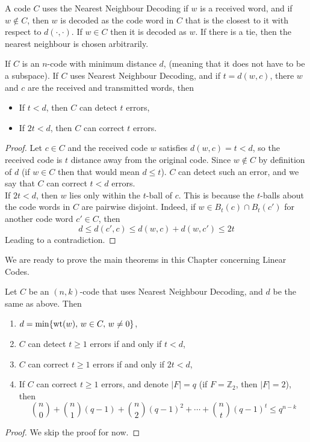 \documentclass[../../main.tex]{subfiles}
\begin{document}
\begin{definition} A code $C$ uses the Nearest Neighbour Decoding if $w$ is a received word, and if $w\notin C$, then $w$ is decoded as the code word in $C$ that is the closest to it with respect to $d(\cdot,\cdot)$. If $w\in C$ then it is decoded as $w$. If there is a tie, then the nearest neighbour is chosen arbitrarily.
\end{definition}
\begin{wts}
    If $C$ is an $n$-code with minimum distance $d$, (meaning that it does not have to be a subspace). If $C$ uses Nearest Neighbour Decoding, and if $t = d(w,c)$, there $w$ and $c$ are the received and transmitted words, then
    \begin{itemize}
        \item If $t<d$, then $C$ can detect $t$ errors,
        \item If $2t<d$, then $C$ can correct $t$ errors.
    \end{itemize}
\end{wts}
\begin{proof}
    Let $c\in C$ and the received code $w$ satisfies $d(w,c)=t<d$, so the received code is $t$ distance away from the original code. Since $w\notin C$ by definition of $d$ (if $w\in C$ then that would mean $d\leq t$). $C$ can detect such an error, and we say that $C$ can correct $t<d$ errors.\\
    
    If $2t<d$, then $w$ lies only within the $t$-ball of $c$. This is because the $t$-balls about the code words in $C$ are pairwise disjoint. Indeed, if $w\in B_t(c)\cap B_t(c')$ for another code word $c'\in C$, then
    \[
    d\leq d(c',c)\leq d(w,c) + d(w,c')\leq 2t
    \]
    Leading to a contradiction.
\end{proof}
We are ready to prove the main theorems in this Chapter concerning Linear Codes.
\begin{wts}
    Let $C$ be an $(n,k)$-code that uses Nearest Neighbour Decoding, and $d$ be the same as above. Then
    \begin{enumerate}
        \item $d = \min\{\operatorname{wt}(w),\, w\in C,\, w\neq 0\}$,
        \item $C$ can detect $t\geq 1$ errors if and only if $t<d$,
        \item $C$ can correct $t\geq 1$ errors if and only if $2t<d$,
        \item If $C$ can correct $t\geq 1$ errors, and denote $|F| = q$ (if $F =\mathbb{Z}_2$, then $|F|=2$), then
        \[
        \binom{n}{0} + \binom{n}{1}(q-1)+\binom{n}{2}(q-1)^2 + \cdots + \binom{n}{t}(q-1)^t \leq q^{n-k}
        \]
    \end{enumerate}
\end{wts}
\begin{proof}
    We skip the proof for now.
\end{proof}
\end{document}
